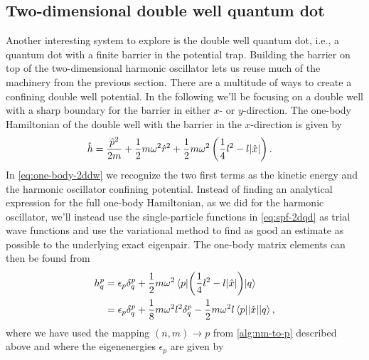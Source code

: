     \subsection{Two-dimensional double well quantum dot}
        Another interesting system to explore is the double well quantum dot,
        i.e., a quantum dot with a finite barrier in the potential trap.
        Building the barrier on top of the two-dimensional harmonic oscillator
        lets us reuse much of the machinery from the previous section.
        There are a multitude of ways to create a confining double well
        potential.
        In the following we'll be focusing on a double well with a sharp
        boundary for the barrier in either $x$- or $y$-direction.
        The one-body Hamiltonian of the double well with the barrier in the
        $x$-direction is given by
        \begin{align}
            \onehamil
            &=
            \frac{\momentum^2}{2m}
            + \half m \omega^2 \position[r]^2
            + \half m \omega^2 \para{
                \frac{1}{4} l^2 - l\abs{\position}
            }.
            \label{eq:one-body-2ddw}
        \end{align}
        In \autoref{eq:one-body-2ddw} we recognize the two first terms as the
        kinetic energy and the harmonic oscillator confining potential.
        Instead of finding an analytical expression for the full one-body
        Hamiltonian, as we did for the harmonic oscillator, we'll instead use
        the single-particle functions in \autoref{eq:spf-2dqd} as trial wave
        functions and use the variational method to find as good an estimate as
        possible to the underlying exact eigenpair.
        The one-body matrix elements can then be found from
        \begin{align}
            h^{p}_{q}
            &= \epsilon_{p}\delta^{p}_{q}
            + \frac{1}{2} m \omega^2\mel{p}{\left( 
                \frac{1}{4} l^2 - l \abs{\hat{x}}
             \right)}{q}
            \\
            &= \epsilon_{p}\delta^{p}_{q}
            + \frac{1}{8} m \omega^2 l^2 \delta^{p}_{q}
            - \frac{1}{2} m \omega^2 l \mel{p}{\abs{\hat{x}}}{q},
        \end{align}
        where we have used the mapping $(n, m) \to p$ from
        \autoref{alg:nm-to-p} described above and where
        the eigenenergies $\epsilon_p$ are given by
